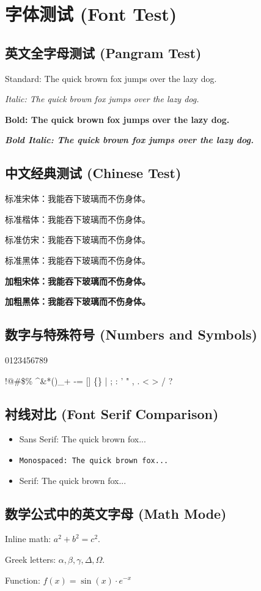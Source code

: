 \chapter{字体测试 (Font Test)}

\section{英文全字母测试 (Pangram Test)}
Standard: The quick brown fox jumps over the lazy dog.

\textit{Italic: The quick brown fox jumps over the lazy dog. }

\textbf{Bold: The quick brown fox jumps over the lazy dog.}

\textbf{\textit{Bold Italic: The quick brown fox jumps over the lazy dog. }}


\section{中文经典测试 (Chinese Test)}

{\songti 标准宋体：我能吞下玻璃而不伤身体。}

{\kaishu 标准楷体：我能吞下玻璃而不伤身体。}

{\fangsong 标准仿宋：我能吞下玻璃而不伤身体。}

{\heiti 标准黑体：我能吞下玻璃而不伤身体。}

{\bfseries\songti 加粗宋体：我能吞下玻璃而不伤身体。}

{\bfseries\heiti 加粗黑体：我能吞下玻璃而不伤身体。}


\section{数字与特殊符号 (Numbers and Symbols)}
0123456789 

!@\#\$\% \textasciicircum \&*()\_+ -= [] \{\} | ; : ' " , . < > / ?

\section{衬线对比 (Font Serif Comparison)}
\begin{itemize}[nosep]
    \item \textsf{Sans Serif: The quick brown fox...}
    \item \texttt{Monospaced: The quick brown fox...}
    \item \textrm{Serif: The quick brown fox...}
\end{itemize}

\section{数学公式中的英文字母 (Math Mode)}
Inline math: $a^2 + b^2 = c^2$. 

Greek letters: $\alpha, \beta, \gamma, \Delta, \Omega$. 

Function: $f(x) = \sin(x) \cdot e^{-x}$
